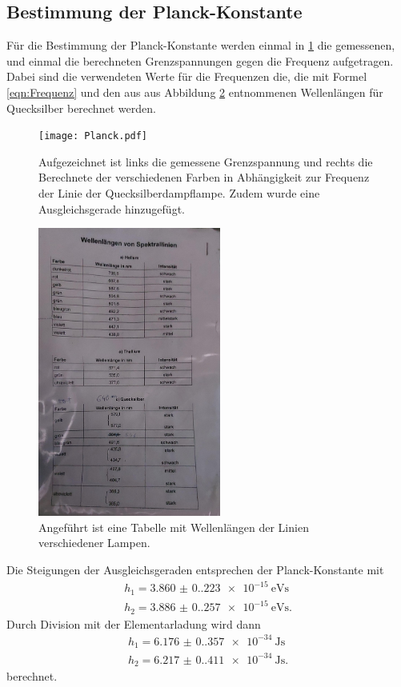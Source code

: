\subsection{Bestimmung der Planck-Konstante}
Für die Bestimmung der Planck-Konstante werden einmal in \ref{fig:Planck} die gemessenen, und einmal die berechneten Grenzspannungen gegen die Frequenz aufgetragen.
Dabei sind die verwendeten Werte für die Frequenzen die, die mit Formel \ref{eqn:Frequenz} und den aus aus Abbildung \ref{fig:Wellenlängen} entnommenen Wellenlängen für Quecksilber berechnet werden.

\begin{figure}[H]
  \centering
  \texttt{[image: Planck.pdf]}
  \caption{Aufgezeichnet ist links die gemessene Grenzspannung und rechts die Berechnete der verschiedenen Farben in Abhängigkeit zur Frequenz der Linie der Quecksilberdampflampe.
  Zudem wurde eine Ausgleichsgerade hinzugefügt.}
  \label{fig:Planck}
\end{figure}

\begin{figure}[H]
  \centering
  \includegraphics[width=6cm]{Bilder/Well.jpg}
  \caption{Angeführt ist eine Tabelle mit Wellenlängen der Linien verschiedener Lampen.}
  \label{fig:Wellenlängen}
\end{figure}

Die Steigungen der Ausgleichsgeraden entsprechen der Planck-Konstante mit
\begin{gather*}
h_1=\qty{3.860(0.223)e-15}{\electronvolt\second}\\
h_2=\qty{3.886(0.257)e-15}{\electronvolt\second}.
\end{gather*}
Durch Division mit der Elementarladung wird dann 
\begin{gather*}
  h_1=\qty{6.176(0.357)e-34}{\joule\second}\\
  h_2=\qty{6.217(0.411)e-34}{\joule\second}.
\end{gather*}
berechnet.

